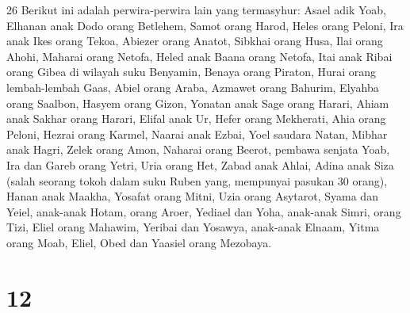 \par 26 Berikut ini adalah perwira-perwira lain yang termasyhur: Asael adik Yoab, Elhanan anak Dodo orang Betlehem, Samot orang Harod, Heles orang Peloni, Ira anak Ikes orang Tekoa, Abiezer orang Anatot, Sibkhai orang Husa, Ilai orang Ahohi, Maharai orang Netofa, Heled anak Baana orang Netofa, Itai anak Ribai orang Gibea di wilayah suku Benyamin, Benaya orang Piraton, Hurai orang lembah-lembah Gaas, Abiel orang Araba, Azmawet orang Bahurim, Elyahba orang Saalbon, Hasyem orang Gizon, Yonatan anak Sage orang Harari, Ahiam anak Sakhar orang Harari, Elifal anak Ur, Hefer orang Mekherati, Ahia orang Peloni, Hezrai orang Karmel, Naarai anak Ezbai, Yoel saudara Natan, Mibhar anak Hagri, Zelek orang Amon, Naharai orang Beerot, pembawa senjata Yoab, Ira dan Gareb orang Yetri, Uria orang Het, Zabad anak Ahlai, Adina anak Siza (salah seorang tokoh dalam suku Ruben yang, mempunyai pasukan 30 orang), Hanan anak Maakha, Yosafat orang Mitni, Uzia orang Asytarot, Syama dan Yeiel, anak-anak Hotam, orang Aroer, Yediael dan Yoha, anak-anak Simri, orang Tizi, Eliel orang Mahawim, Yeribai dan Yosawya, anak-anak Elnaam, Yitma orang Moab, Eliel, Obed dan Yaasiel orang Mezobaya.

\chapter{12}

